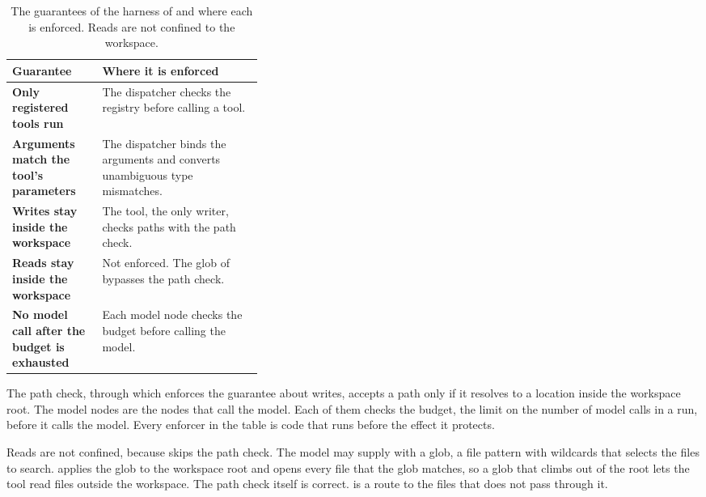 \begin{table}[htbp]
  \caption{The guarantees of the harness of \msa{} and where each is enforced. Reads are not
  confined to the workspace.}
  \label{tab:recap-guarantees}
  \begin{adjustbox}{width=\linewidth}\begin{tabularx}{\linewidth}{@{}L{0.36\linewidth}X@{}}
    \toprule
    \textbf{Guarantee} & \textbf{Where it is enforced} \\
    \midrule
    \textbf{Only registered tools run} & The dispatcher checks the registry before calling a tool. \\
    \textbf{Arguments match the tool's parameters} & The dispatcher binds the arguments and converts
      unambiguous type mismatches. \\
    \textbf{Writes stay inside the workspace} & The  tool, the only writer, checks
      paths with the path check. \\
    \textbf{Reads stay inside the workspace} & Not enforced. The glob of  bypasses
      the path check. \\
    \textbf{No model call after the budget is exhausted} & Each model node checks the budget before
      calling the model. \\
    \bottomrule
  \end{tabularx}\end{adjustbox}
\end{table}

The path check, through which  enforces the guarantee about writes, accepts a path
only if it resolves to a location inside the workspace root. The model nodes are the nodes that
call the model. Each of them checks the budget, the limit on the number of model calls in a run,
before it calls the model. Every enforcer in the table is code that runs before the effect it protects.

Reads are not confined, because  skips the path check. The model may supply
 with a glob, a file pattern with wildcards that selects the files to search.
 applies the glob to the workspace root and opens every file that the glob matches,
so a glob that climbs out of the root lets the tool read files outside the workspace. The path
check itself is correct.  is a route to the files that does not pass through it.

